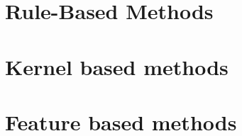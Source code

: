 \section{Rule-Based Methods}

\section{Kernel based methods} %


\section{Feature based methods}  %
\label{section1.3}

\section{}